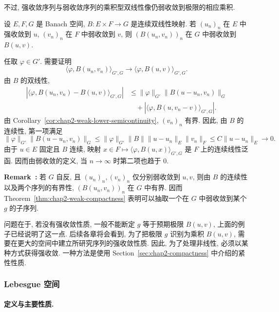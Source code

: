 不过, 强收敛序列与弱收敛序列的乘积型双线性像仍弱收敛到极限的相应乘积.

\begin{Proposition}
\label{prop:chap2-strong-weak-bilinear}
设 $E,F,G$ 是 Banach 空间, $B:E\times F\to G$ 是连续双线性映射. 若 $(u_n)_n$ 在 $E$ 中强收敛到 $u$, $(v_n)_n$ 在 $F$ 中弱收敛到 $v$, 则 $(B(u_n,v_n))_n$ 在 $G$ 中弱收敛到 $B(u,v)$.
\end{Proposition}

\begin{Proof}
任取 $\varphi\in G'$. 需要证明
\[
  \langle\varphi,B(u_n,v_n)\rangle_{G',G}
  \longrightarrow
  \langle\varphi,B(u,v)\rangle_{G',G}.
\]
由 $B$ 的双线性,
\begin{align*}
|\langle\varphi,B(u_n,v_n)-B(u,v)\rangle_{G',G}|
&\leq\|\varphi\|_{G'}\|B(u-u_n,v_n)\|_G\\
&\quad+|\langle\varphi,B(u,v_n-v)\rangle_{G',G}|.
\end{align*}
由 Corollary~\ref{cor:chap2-weak-lower-semicontinuity}, $(v_n)_n$ 有界. 因此, 由 $B$ 的连续性, 第一项满足
\[
\|\varphi\|_{G'}\|B(u-u_n,v_n)\|_G
\leq\|\varphi\|_{G'}\|B\|\|u-u_n\|_E\|v_n\|_F
\leq C\|u-u_n\|_E\longrightarrow0.
\]
由于 $u\in E$ 固定且 $B$ 连续, 映射 $x\in F\mapsto\langle\varphi,B(u,x)\rangle_{G',G}$ 是 $F$ 上的连续线性泛函. 因而由弱收敛的定义, 当 $n\to\infty$ 时第二项也趋于 $0$.
\end{Proof}

\label{rem:chap2-weak-products}
\par\noindent\textbf{Remark~\thesourceremark:}\quad
若 $G$ 自反, 且 $(u_n)_n,(v_n)_n$ 仅分别弱收敛到 $u,v$, 则由 $B$ 的连续性以及两个序列的有界性, $(B(u_n,v_n))_n$ 在 $G$ 中有界. 因而 Theorem~\ref{thm:chap2-weak-compactness} 表明可以抽取一个在 $G$ 中弱收敛到某个 $g$ 的子序列.

问题在于, 若没有强收敛性质, 一般不能断定 $g$ 等于预期极限 $B(u,v)$, 上面的例子已经说明了这一点. 后续各章将会看到, 为了把极限 $g$ 识别为乘积 $B(u,v)$, 需要在更大的空间中建立所研究序列的强收敛性质. 因此, 为了处理非线性, 必须以某种方式获得强收敛. 一种方法是使用 Section~\ref{sec:chap2-compactness} 中介绍的紧性性质.
\subsubsection{Lebesgue 空间}
\label{subsec:chap2-lebesgue-spaces}

\paragraph{定义与主要性质.}
\label{subsec:chap2-lebesgue-definitions}

